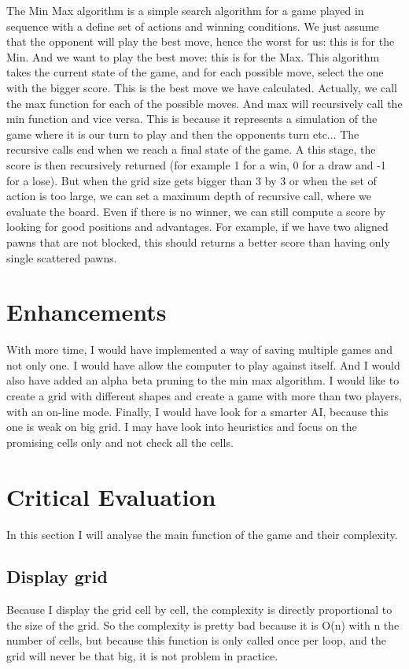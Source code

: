\documentclass[10pt, a4paper]{article}
\begin{document}
The Min Max algorithm is a simple search algorithm for a game played in sequence with a define set of actions and winning conditions. We just assume that the opponent will play the best move, hence the worst for us: this is for the Min. And we want to play the best move: this is for the Max. This algorithm takes the current state of the game, and for each possible move, select the one with the bigger score. This is the best move we have calculated. Actually, we call the max function for each of the possible moves. And max will recursively call the min function and vice versa. This is because it represents a simulation of the game where it is our turn to play and then the opponents turn etc...
The recursive calls end when we reach a final state of the game. A this stage, the score is then recursively returned (for example 1 for a win, 0 for a draw and -1 for a lose).
But when the grid size gets bigger than 3 by 3 or when the set of action is too large, we can set a maximum depth of recursive call, where we evaluate the board. Even if there is no winner, we can still compute a score by looking for good positions and advantages. For example, if we have two aligned pawns that are not blocked, this should returns a better score than having only single scattered pawns.

\section{Enhancements}
With more time, I would have implemented a way of saving multiple games and not only one. I would have allow the computer to play against itself. And I would also have added an alpha beta pruning to the min max algorithm. I would like to create a grid with different shapes and create a game with more than two players, with an on-line mode. Finally, I would have look for a smarter AI, because this one is weak on big grid. I may have look into heuristics and focus on the promising cells only and not check all the cells.

\section{Critical Evaluation}
In this section I will analyse the main function of the game and their complexity.

\subsection{Display grid}
Because I display the grid cell by cell, the complexity is directly proportional to the size of the grid.
So the complexity is pretty bad because it is O(n) with n the number of cells, but because this function is only called once per loop, and the grid will never be that big, it is not problem in practice.
\end{document}
